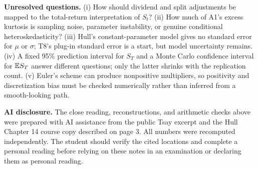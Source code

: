 \textbf{Unresolved questions.} (i) How should dividend and split adjustments be mapped to the total-return interpretation of $S_t$? (ii) How much of A1's excess kurtosis is sampling noise, parameter instability, or genuine conditional heteroskedasticity? (iii) Hull's constant-parameter model gives no standard error for $\mu$ or $\sigma$; T8's plug-in standard error is a start, but model uncertainty remains. (iv) A fixed 95\% prediction interval for $S_T$ and a Monte Carlo confidence interval for $\mathbb E S_T$ answer different questions; only the latter shrinks with the replication count. (v) Euler's scheme can produce nonpositive multipliers, so positivity and discretization bias must be checked numerically rather than inferred from a smooth-looking path.

\textbf{AI disclosure.} The close reading, reconstructions, and arithmetic checks above were prepared with AI assistance from the public Tsay excerpt and the Hull Chapter 14 course copy described on page 3. All numbers were recomputed independently. The student should verify the cited locations and complete a personal reading before relying on these notes in an examination or declaring them as personal reading.
